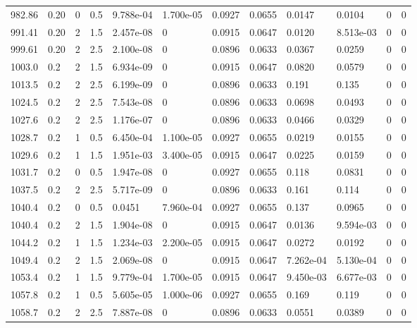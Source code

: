 \documentclass[preview]{standalone}
\begin{document}
{{{{{{\begin{tabular}{L{1.2cm}C{1.2cm} C{0.3cm}C{0.5cm} C{1.4cm}C{1.4cm} C{1.4cm}C{1.4cm} C{1.6cm}C{1.6cm} C{1.6cm}C{1.6cm}}
  982.86  &  0.20  & 0     & 0.5 &  9.788e-04  & 1.700e-05  &  0.0927&   0.0655& 0.0147 & 0.0104   &  0 & 0  \\ 
  991.41  &  0.20  & 2     & 1.5 &  2.457e-08  & 0  &  0.0915&   0.0647& 0.0120 & 8.513e-03   &  0 & 0  \\ 
  999.61  &  0.20  & 2     & 2.5 &  2.100e-08  & 0  &  0.0896&   0.0633& 0.0367 & 0.0259   &  0 & 0  \\ 
  1003.0  &   0.2  & 2     & 1.5 &  6.934e-09  & 0  &  0.0915&   0.0647& 0.0820 & 0.0579   &  0 & 0  \\ 
  1013.5  &   0.2  & 2     & 2.5 &  6.199e-09  & 0  &  0.0896&   0.0633& 0.191 & 0.135   &  0 & 0  \\ 
  1024.5  &   0.2  & 2     & 2.5 &  7.543e-08  & 0  &  0.0896&   0.0633& 0.0698 & 0.0493   &  0 & 0  \\ 
  1027.6  &   0.2  & 2     & 2.5 &  1.176e-07  & 0  &  0.0896&   0.0633& 0.0466 & 0.0329   &  0 & 0  \\ 
  1028.7  &   0.2  & 1     & 0.5 &  6.450e-04  & 1.100e-05  &  0.0927&   0.0655& 0.0219 & 0.0155   &  0 & 0  \\ 
  1029.6  &   0.2  & 1     & 1.5 &  1.951e-03  & 3.400e-05  &  0.0915&   0.0647& 0.0225 & 0.0159   &  0 & 0  \\ 
  1031.7  &   0.2  & 0     & 0.5 &  1.947e-08  & 0  &  0.0927&   0.0655& 0.118 & 0.0831   &  0 & 0  \\ 
  1037.5  &   0.2  & 2     & 2.5 &  5.717e-09  & 0  &  0.0896&   0.0633& 0.161 & 0.114   &  0 & 0  \\ 
  1040.4  &   0.2  & 0     & 0.5 &  0.0451  & 7.960e-04  &  0.0927&   0.0655& 0.137 & 0.0965   &  0 & 0  \\ 
  1040.4  &   0.2  & 2     & 1.5 &  1.904e-08  & 0  &  0.0915&   0.0647& 0.0136 & 9.594e-03   &  0 & 0  \\ 
  1044.2  &   0.2  & 1     & 1.5 &  1.234e-03  & 2.200e-05  &  0.0915&   0.0647& 0.0272 & 0.0192   &  0 & 0  \\ 
  1049.4  &   0.2  & 2     & 1.5 &  2.069e-08  & 0  &  0.0915&   0.0647& 7.262e-04 & 5.130e-04   &  0 & 0  \\ 
  1053.4  &   0.2  & 1     & 1.5 &  9.779e-04  & 1.700e-05  &  0.0915&   0.0647& 9.450e-03 & 6.677e-03   &  0 & 0  \\ 
  1057.8  &   0.2  & 1     & 0.5 &  5.605e-05  & 1.000e-06  &  0.0927&   0.0655& 0.169 & 0.119   &  0 & 0  \\ 
  1058.7  &   0.2  & 2     & 2.5 &  7.887e-08  & 0  &  0.0896&   0.0633& 0.0551 & 0.0389   &  0 & 0  \\ 

\end{tabular}}}}}}}
\end{document}
